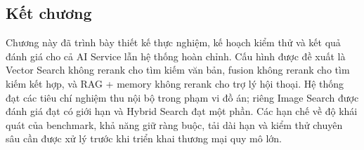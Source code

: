 \subsection{Kết chương}

Chương này đã trình bày thiết kế thực nghiệm, kế hoạch kiểm thử và kết quả đánh giá cho cả AI Service lẫn hệ thống hoàn chỉnh. Cấu hình được đề xuất là Vector Search không rerank cho tìm kiếm văn bản, fusion không rerank cho tìm kiếm kết hợp, và RAG + memory không rerank cho trợ lý hội thoại. Hệ thống đạt các tiêu chí nghiệm thu nội bộ trong phạm vi đồ án; riêng Image Search được đánh giá đạt có giới hạn và Hybrid Search đạt một phần. Các hạn chế về độ khái quát của benchmark, khả năng giữ ràng buộc, tải dài hạn và kiểm thử chuyên sâu cần được xử lý trước khi triển khai thương mại quy mô lớn.
